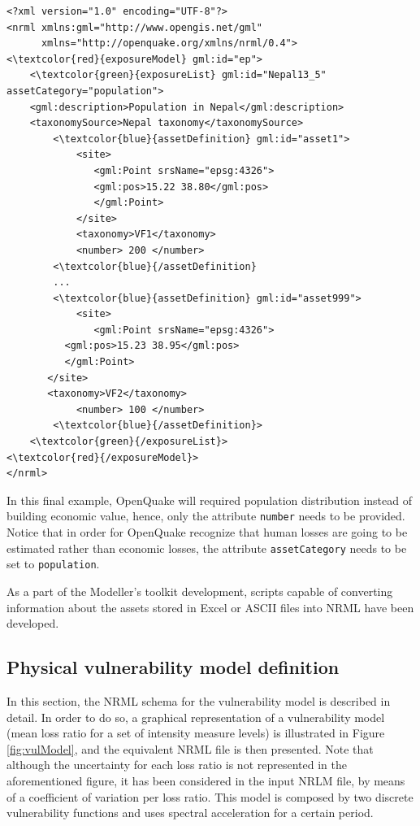 \begin{Verbatim}[frame=single, commandchars=\\\{\}, samepage=false]
<?xml version="1.0" encoding="UTF-8"?>
<nrml xmlns:gml="http://www.opengis.net/gml"
      xmlns="http://openquake.org/xmlns/nrml/0.4">
<\textcolor{red}{exposureModel} gml:id="ep">
    <\textcolor{green}{exposureList} gml:id="Nepal13_5" assetCategory="population">
    <gml:description>Population in Nepal</gml:description>
    <taxonomySource>Nepal taxonomy</taxonomySource>
        <\textcolor{blue}{assetDefinition} gml:id="asset1">
            <site>
               <gml:Point srsName="epsg:4326">
               <gml:pos>15.22 38.80</gml:pos>
               </gml:Point>
            </site>
            <taxonomy>VF1</taxonomy>
            <number> 200 </number>
        <\textcolor{blue}{/assetDefinition} 
        ...
        <\textcolor{blue}{assetDefinition} gml:id="asset999">
            <site>
               <gml:Point srsName="epsg:4326">
	      <gml:pos>15.23 38.95</gml:pos>
	      </gml:Point>
	   </site>
	   <taxonomy>VF2</taxonomy>
            <number> 100 </number>
        <\textcolor{blue}{/assetDefinition}> 
    <\textcolor{green}{/exposureList}>
<\textcolor{red}{/exposureModel}>
</nrml>
\end{Verbatim}

In this final example, OpenQuake will required population distribution instead of building economic value, hence, only the attribute \Verb+number+ needs to be provided. Notice that in order for OpenQuake recognize that human losses are going to be estimated rather than economic losses, the attribute  \Verb+assetCategory+ needs to be set to  \Verb+population+.  
 
As a part of the Modeller's toolkit development, scripts capable of converting information about the assets stored in Excel or ASCII files into NRML have been developed. 

\subsection{Physical vulnerability model definition}
In this section, the NRML schema for the vulnerability model is described in detail. In order to do so, a graphical representation of a vulnerability model (mean loss ratio for a set of intensity measure levels) is illustrated in Figure \ref{fig:vulModel}, and the equivalent NRML file is then presented. Note that although the uncertainty for each loss ratio is not represented in the aforementioned figure, it has been considered in the input NRLM file, by means of a coefficient of variation per loss ratio. This model is composed by two discrete vulnerability functions and uses spectral acceleration for a certain period. 

